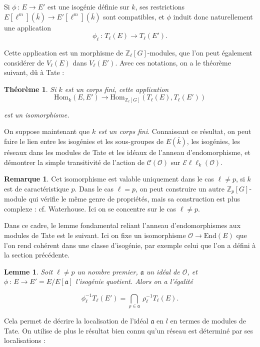 \documentclass[11pt,a4paper]{article}
\newcommand{\Z}{\mathbb{Z}}
\renewcommand{\O}{\mathcal{O}}
\newcommand{\Cl}{\mathcal{C}}
\newcommand{\vers}{\rightarrow}
\newcommand{\End}{\mathrm{End}}
\newcommand{\Hom}{\mathrm{Hom}}
\newcommand{\Ell}{\mathcal{E}\ell\ell}
\renewcommand{\frak}{\mathfrak}
\newcommand{\de}{\,:\,}
\newtheorem*{thm}{Théorème}
\newtheorem*{lem}{Lemme}
\theoremstyle{definition}
\newtheorem*{rem}{Remarque}
\begin{document}
Si $\phi\de E\vers E'$ est une isogénie définie sur $k$, ses restrictions $E[\ell^m](\bar{k})\vers E'[\ell^m](\bar{k})$ sont compatibles, et $\phi$ induit donc naturellement une application
$$ \phi_\ell\de T_\ell(E)\vers T_\ell(E').$$

Cette application est un morphisme de $\Z_\ell[G]$-modules, que l'on peut également considérer de $V_\ell(E)$ dans $V_\ell(E')$. Avec ces notations, on a le théorème suivant, dû à Tate :

\begin{thm} Si $k$ est un corps fini, cette application
$$\Hom_k(E, E') \vers \Hom_{\Z_\ell[G]} (T_\ell(E), T_\ell(E'))$$

est un isomorphisme.
\end{thm}

On suppose maintenant que \emph{$k$ est un corps fini}. Connaissant ce résultat, on peut faire le lien entre les isogénies et les sous-groupes de $E(\bar{k})$, les isogénies, les réseaux dans les modules de Tate et les idéaux de l'anneau d'endomorphisme, et démontrer la simple transitivité de l'action de $\Cl(\O)$ sur $\Ell_k(\O)$.

\begin{rem}

Cet isomorphisme est valable uniquement dans le cas $\ell\neq p$, si $k$ est de caractéristique $p$. Dans le cas $\ell=p$, on peut construire un autre $\Z_p[G]$-module qui vérifie le même genre de propriétés, mais sa construction est plus complexe : cf. Waterhouse. Ici on se concentre sur le cas $\ell\neq p$.

\end{rem}

Dans ce cadre, le lemme fondamental reliant l'anneau d'endomorphismes aux modules de Tate est le suivant. Ici on fixe un isomorphisme $\O\vers \End(E)$ que l'on rend cohérent dans une classe d'isogénie, par exemple celui que l'on a défini à la section précédente.

\begin{lem}

Soit $\ell\neq p$ un nombre premier, $\frak a$ un idéal de $\O$, et $\phi\de E\vers E' = E/E[\frak a]$ l'isogénie quotient. Alors on a l'égalité

$$\phi_\ell^{-1} T_\ell(E') = \bigcap_{\rho\in\frak a}\ \rho_\ell^{-1} T_\ell(E) .$$
\end{lem}

Cela permet de décrire la localisation de l'idéal $\frak a$ en $l$ en termes de modules de Tate. On utilise de plus le résultat bien connu qu'un réseau est déterminé par ses localisations :
\end{document}
